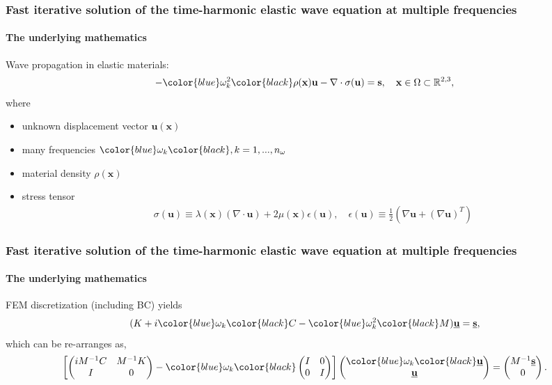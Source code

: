 \documentclass{beamer}
\begin{document}
\begin{frame}
\frametitle{Fast iterative solution of the time-harmonic elastic wave equation at multiple frequencies}
\framesubtitle{The underlying mathematics}
Wave propagation in elastic materials:
\begin{align*}
 -\color{blue}\omega_k^2\color{black} \rho(\mathbf{x}) \mathbf{u} - \nabla \cdot \sigma(\mathbf{u}) = \mathbf{s}, \quad \mathbf{x} \in \Omega \subset \mathbb{R}^{2,3},
\end{align*}
where
\begin{itemize}
 \item unknown displacement vector $\mathbf{u}(\mathbf{x})$
 \pause
 \item many frequencies $\color{blue}\omega_k\color{black}, k=1,...,n_\omega$
 \pause
 \item material density $\rho(\mathbf{x})$
 \pause
 \item stress tensor
 \begin{align*}
   \sigma(\mathbf{u}) \equiv \lambda(\mathbf{x}) \left( \nabla \cdot \mathbf{u} \right) + 2 \mu(\mathbf{x}) \epsilon(\mathbf{u}), \quad  \epsilon(\mathbf{u}) \equiv \frac{1}{2} \left( \nabla \mathbf{u} + \left( \nabla \mathbf{u}\right)^T \right)
 \end{align*}
\end{itemize}

\end{frame}

\begin{frame}
\frametitle{Fast iterative solution of the time-harmonic elastic wave equation at multiple frequencies}
\framesubtitle{The underlying mathematics}
FEM discretization (including BC) yields
\begin{align*}
(K + i \color{blue}\omega_k\color{black} C - \color{blue}\omega_k^2\color{black} M)\underline{\mathbf{u}} = \underline{\mathbf{s}},
\end{align*}
which can be re-arranges as,
\begin{align*}
\left[\begin{pmatrix} i M^{-1}C & M^{-1}K \\ I & 0\end{pmatrix} - \color{blue}\omega_k\color{black} \begin{pmatrix} I & 0 \\ 0 & I\end{pmatrix} \right] \begin{pmatrix} \color{blue}\omega_k\color{black} \underline{\mathbf{u}} \\  \underline{\mathbf{u}}\end{pmatrix} = \begin{pmatrix} M^{-1}\underline{\mathbf{s}} \\ 0\end{pmatrix}.
\end{align*}
\end{frame}
\end{document}
